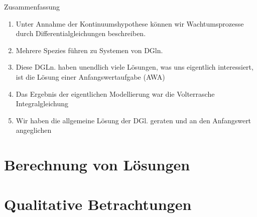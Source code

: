 \documentclass[notheorems,hidelinks,aspectratio=1610]{beamer}
\begin{document}
\begin{frame}{Zusammenfassung}
  \begin{enumerate}
  \item Unter Annahme der Kontinuumshypothese können wir
    Wachtumsprozesse durch Differentialgleichungen
    beschreiben.
  \item Mehrere Spezies führen zu Systemen von DGln.
  \item Diese DGLn. haben unendlich viele Lösungen, was uns eigentlich interessiert, ist die Lösung einer Anfangswertaufgabe (AWA)
  \item Das Ergebnis der eigentlichen Modellierung war die
    Volterrasche Integralgleichung
  \item Wir haben die allgemeine Lösung der DGl. geraten und an den
    Anfangswert angeglichen
  \end{enumerate}
\end{frame}

\section{Berechnung von Lösungen}
\frame{\sectoc}

\section{Qualitative Betrachtungen}
\frame{\sectoc}
\end{document}
